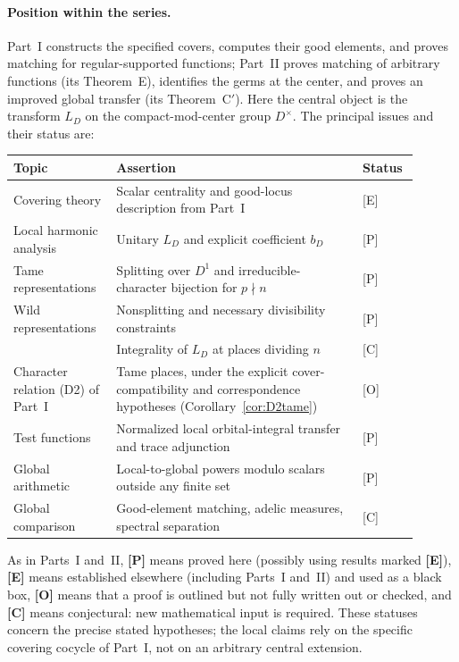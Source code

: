 \documentclass[11pt]{article}
\theoremstyle{plain}
\theoremstyle{definition}
\begin{document}
\paragraph{Position within the series.}
Part~I constructs the specified covers, computes their good elements, and
proves matching for regular-supported functions; Part~II proves matching of
arbitrary functions (its Theorem~E), identifies the germs at the center, and
proves an improved global transfer (its Theorem~C$'$). Here the central object
is the transform $L_D$ on the compact-mod-center group $D^\times$.
The principal issues and their status are:
\begin{center}
\small
\begin{tabular}{@{}p{0.23\linewidth}p{0.57\linewidth}p{0.10\linewidth}@{}}
\toprule
\textbf{Topic} & \textbf{Assertion} & \textbf{Status}\\
\midrule
Covering theory & Scalar centrality and good-locus description from Part~I & [E]\\
Local harmonic analysis & Unitary $L_D$ and explicit coefficient $b_D$ & [P]\\
Tame representations & Splitting over $D^1$ and irreducible-character bijection for $p\nmid n$ & [P]\\
Wild representations & Nonsplitting and necessary divisibility constraints & [P]\\
 & Integrality of $L_D$ at places dividing $n$ & [C]\\
Character relation (D2) of Part~I & Tame places, under the explicit cover-compatibility and correspondence hypotheses (Corollary~\ref{cor:D2tame}) & [O]\\
Test functions & Normalized local orbital-integral transfer and trace adjunction & [P]\\
Global arithmetic & Local-to-global powers modulo scalars outside any finite set & [P]\\
Global comparison & Good-element matching, adelic measures, spectral separation & [C]\\
\bottomrule
\end{tabular}
\end{center}
As in Parts~I and~II, \textbf{[P]} means proved here (possibly using
results marked \textbf{[E]}), \textbf{[E]} means established elsewhere
(including Parts~I and~II) and used as a black box, \textbf{[O]} means that
a proof is outlined but not fully written out or checked, and \textbf{[C]}
means conjectural: new mathematical input is required.
These statuses concern the precise stated hypotheses; the local
claims rely on the specific covering cocycle of Part~I, not on
an arbitrary central extension.
\end{document}
